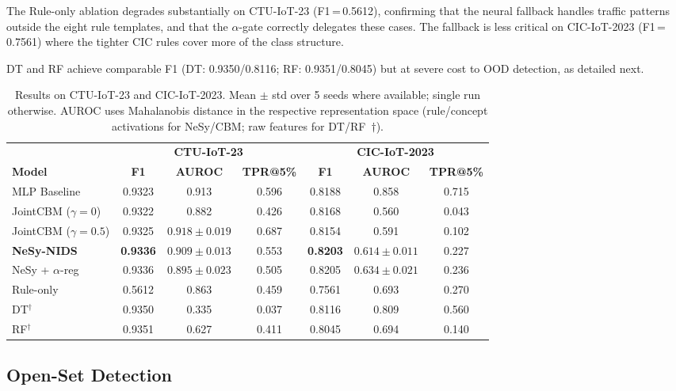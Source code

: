 \documentclass[conference]{IEEEtran}
\begin{document}
The Rule-only ablation degrades substantially on CTU-IoT-23 (F1\,=\,0.5612),
confirming that the neural fallback handles traffic patterns outside the
eight rule templates, and that the $\alpha$-gate correctly delegates these
cases. The fallback is less critical on CIC-IoT-2023 (F1\,=\,0.7561) where
the tighter CIC rules cover more of the class structure.

DT and RF achieve comparable F1 (DT: 0.9350/0.8116; RF: 0.9351/0.8045) but
at severe cost to OOD detection, as detailed next.

\begin{table}[!t]
\renewcommand{\arraystretch}{1.15}
\caption{Results on CTU-IoT-23 and CIC-IoT-2023. Mean $\pm$ std over 5 seeds
where available; single run otherwise. AUROC uses Mahalanobis distance in
the respective representation space (rule/concept activations for NeSy/CBM;
raw features for DT/RF~$\dagger$).}
\label{tab:main}
\centering
\small
\begin{tabular}{lcccccc}
\toprule
& \multicolumn{3}{c}{\textbf{CTU-IoT-23}} &
  \multicolumn{3}{c}{\textbf{CIC-IoT-2023}} \\
\cmidrule(lr){2-4}\cmidrule(lr){5-7}
\textbf{Model} & \textbf{F1} & \textbf{AUROC} & \textbf{TPR@5\%} &
                 \textbf{F1} & \textbf{AUROC} & \textbf{TPR@5\%} \\
\midrule
MLP Baseline
  & 0.9323 & 0.913 & 0.596
  & 0.8188 & 0.858 & 0.715 \\
JointCBM ($\gamma{=}0$)
  & 0.9322 & 0.882 & 0.426
  & 0.8168 & 0.560 & 0.043 \\
JointCBM ($\gamma{=}0.5$)
  & 0.9325 & $0.918\pm0.019$ & 0.687
  & 0.8154 & 0.591 & 0.102 \\
\textbf{NeSy-NIDS}
  & \textbf{0.9336} & $\mathbf{0.909\pm0.013}$ & 0.553
  & \textbf{0.8203} & $\mathbf{0.614\pm0.011}$ & 0.227 \\
NeSy + $\alpha$-reg
  & 0.9336 & $0.895\pm0.023$ & 0.505
  & 0.8205 & $0.634\pm0.021$ & 0.236 \\
Rule-only
  & 0.5612 & 0.863 & 0.459
  & 0.7561 & 0.693 & 0.270 \\
DT$^\dagger$
  & 0.9350 & 0.335 & 0.037
  & 0.8116 & 0.809 & 0.560 \\
RF$^\dagger$
  & 0.9351 & 0.627 & 0.411
  & 0.8045 & 0.694 & 0.140 \\
\bottomrule
\end{tabular}
\end{table}

\subsection{Open-Set Detection}
\end{document}
